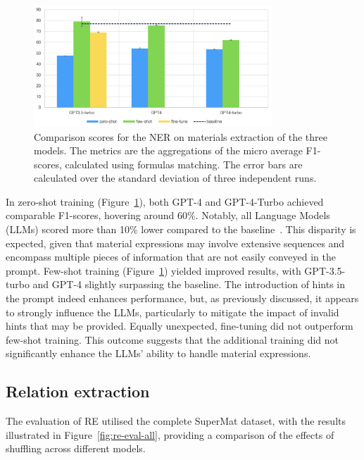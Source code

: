 \documentclass[a4paper]{article}
\begin{document}
\begin{figure}[htbp]
  \centering
  \includegraphics[width=0.8\textwidth]{figures/ner-supermat-all.png} 
  \caption{Comparison scores for the NER on materials extraction of the three models. The metrics are the aggregations of the micro average F1-scores, calculated using formulas matching. The error bars are calculated over the standard deviation of three independent runs.}
  \label{fig:ner-materials-all}
\end{figure}

In zero-shot training (Figure~\ref{fig:ner-materials-all}), both GPT-4 and GPT-4-Turbo achieved comparable F1-scores, hovering around 60\%. Notably, all Language Models (LLMs) scored more than 10\% lower compared to the baseline~\cite{lfoppiano2023automatic}. This disparity is expected, given that material expressions may involve extensive sequences and encompass multiple pieces of information that are not easily conveyed in the prompt.
Few-shot training (Figure~\ref{fig:ner-materials-all}) yielded improved results, with GPT-3.5-turbo and GPT-4 slightly surpassing the baseline. 
The introduction of hints in the prompt indeed enhances performance, but, as previously discussed, it appears to strongly influence the LLMs, particularly to mitigate the impact of invalid hints that may be provided.
Equally unexpected, fine-tuning did not outperform few-shot training. This outcome suggests that the additional training did not significantly enhance the LLMs' ability to handle material expressions.

\subsection{Relation extraction}
\label{sec:results-re}

The evaluation of RE utilised the complete SuperMat dataset, with the results illustrated in Figure~\ref{fig:re-eval-all}, providing a comparison of the effects of shuffling across different models. 
\end{document}
